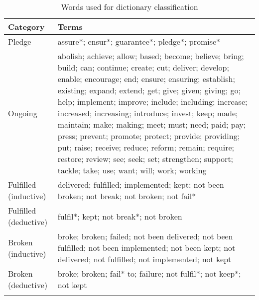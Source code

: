 \begingroup\footnotesize
\begin{longtable}{p{}p{}}
\caption{Words used for dictionary classification} \\ 
  \hline
Category & Terms \\ 
  \hline 
\endhead 
\hline 
\endfoot 
\endlastfoot 
Pledge & assure*; ensur*; guarantee*; pledge*; promise* \\ 
  Ongoing & abolish; achieve; allow; based; become; believe; bring; build; can; continue; create; cut; deliver; develop; enable; encourage; end; ensure; ensuring; establish; existing; expand; extend; get; give; given; giving; go; help; implement; improve; include; including; increase; increased; increasing; introduce; invest; keep; made; maintain; make; making; meet; must; need; paid; pay; press; prevent; promote; protect; provide; providing; put; raise; receive; reduce; reform; remain; require; restore; review; see; seek; set; strengthen; support; tackle; take; use; want; will; work; working \\ 
  Fulfilled (inductive) & delivered; fulfilled; implemented; kept; not been broken; not break; not broken; not fail* \\ 
  Fulfilled (deductive) & fulfil*; kept; not break*; not broken \\ 
  Broken (inductive) & broke; broken; failed; not been delivered; not been fulfilled; not been implemented; not been kept; not delivered; not fulfilled; not implemented; not kept \\ 
  Broken (deductive) & broke; broken; fail* to; failure; not fulfil*; not keep*; not kept \\ 
  \hline
\label{tab:words_dictionary}
\end{longtable}
\endgroup
